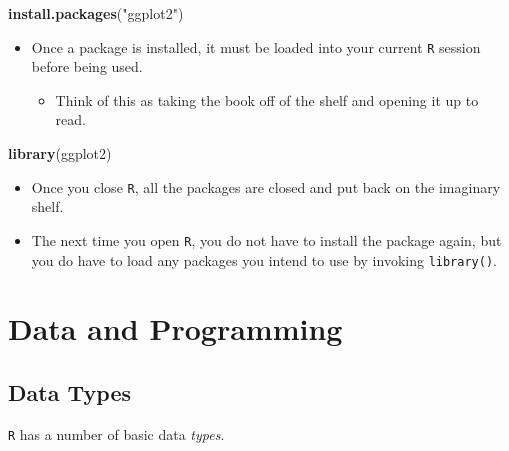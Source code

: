\documentclass[]{book}
\newenvironment{Shaded}{\begin{snugshade}}{\end{snugshade}}
\newcommand{\KeywordTok}[1]{\textcolor[rgb]{0.13,0.29,0.53}{\textbf{#1}}}
\newcommand{\NormalTok}[1]{#1}
\newcommand{\StringTok}[1]{\textcolor[rgb]{0.31,0.60,0.02}{#1}}
\providecommand{\tightlist}{%
  \setlength{\itemsep}{0pt}\setlength{\parskip}{0pt}}
\begin{document}
\begin{Shaded}
\begin{Highlighting}[]
\KeywordTok{install.packages}\NormalTok{(}\StringTok{"ggplot2"}\NormalTok{)}
\end{Highlighting}
\end{Shaded}

\begin{itemize}
\tightlist
\item
  Once a package is installed, it must be loaded into your current \texttt{R} session before being used.

  \begin{itemize}
  \tightlist
  \item
    Think of this as taking the book off of the shelf and opening it up to read.
  \end{itemize}
\end{itemize}

\begin{Shaded}
\begin{Highlighting}[]
\KeywordTok{library}\NormalTok{(ggplot2)}
\end{Highlighting}
\end{Shaded}

\begin{itemize}
\tightlist
\item
  Once you close \texttt{R}, all the packages are closed and put back on the imaginary shelf.
\item
  The next time you open \texttt{R}, you do not have to install the package again, but you do have to load any packages you intend to use by invoking \texttt{library()}.
\end{itemize}

\hypertarget{data-and-programming}{%
\chapter{Data and Programming}\label{data-and-programming}}

\hypertarget{data-types}{%
\section{Data Types}\label{data-types}}

\texttt{R} has a number of basic data \emph{types}.
\end{document}
